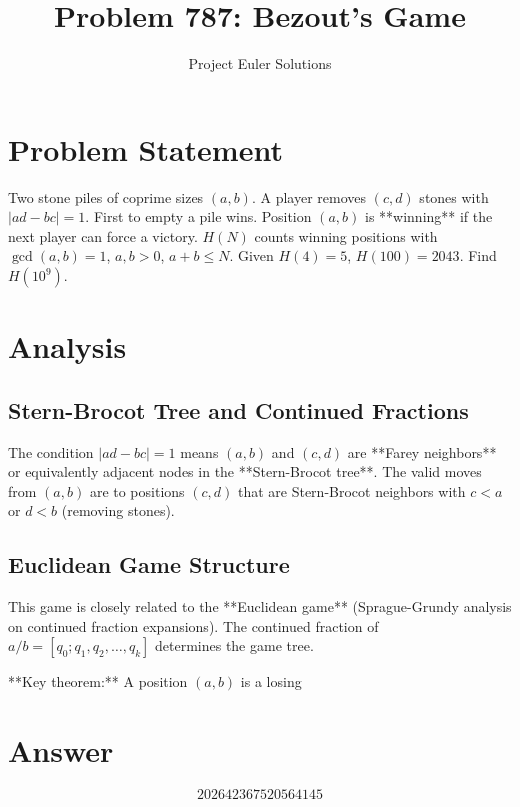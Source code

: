 \documentclass[11pt]{article}
\title{Problem 787: Bezout's Game}
\author{Project Euler Solutions}
\date{}
\begin{document}
\maketitle
\section{Problem Statement}
Two stone piles of coprime sizes $(a, b)$. A player removes $(c, d)$ stones with $|ad - bc| = 1$. First to empty a pile wins. Position $(a,b)$ is **winning** if the next player can force a victory. $H(N)$ counts winning positions with $\gcd(a,b)=1$, $a,b > 0$, $a+b \le N$. Given $H(4)=5$, $H(100)=2043$. Find $H(10^9)$.
\section{Analysis}
\subsection*{Stern-Brocot Tree and Continued Fractions}

The condition $|ad - bc| = 1$ means $(a,b)$ and $(c,d)$ are **Farey neighbors** or equivalently adjacent nodes in the **Stern-Brocot tree**. The valid moves from $(a,b)$ are to positions $(c,d)$ that are Stern-Brocot neighbors with $c < a$ or $d < b$ (removing stones).

\subsection*{Euclidean Game Structure}

This game is closely related to the **Euclidean game** (Sprague-Grundy analysis on continued fraction expansions). The continued fraction of $a/b = [q_0; q_1, q_2, \ldots, q_k]$ determines the game tree.

**Key theorem:** A position $(a,b)$ is a losing
\section{Answer}

\[
\boxed{202642367520564145}
\]
\end{document}
